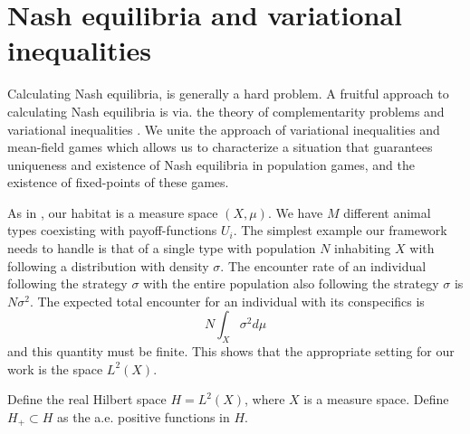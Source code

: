 \section{Nash equilibria and variational inequalities}
Calculating Nash equilibria,  is generally a hard problem. A fruitful approach to calculating Nash equilibria is via. the theory of complementarity problems and variational inequalities \citep{karamardian1969nonlinear,nabetani2011parametrized}. We unite the approach of variational inequalities and mean-field games which allows us to characterize a situation that guarantees uniqueness and existence of Nash equilibria in population games, and the existence of fixed-points of these games.


As in , our habitat is a measure space $(X,\mu)$. We have $M$ different animal types coexisting with payoff-functions $U_i$. The simplest example our framework needs to handle is that of a single type with population $N$ inhabiting $X$ with following a distribution with density $\sigma$. The encounter rate of an individual following the strategy $\sigma$ with the entire population also following the strategy $\sigma$ is $N\sigma^2$. The expected total encounter for an individual with its conspecifics is
\begin{equation}
  N\int_X \sigma^2 d\mu
\end{equation}
and this quantity must be finite. This shows that the appropriate setting for our work is the space $L^2(X)$.
\begin{definition}
  Define the real Hilbert space $H=L^2(X)$, where $X$ is a measure space. Define $H_+ \subset H$ as the a.e. positive functions in $H$.
\end{definition}

